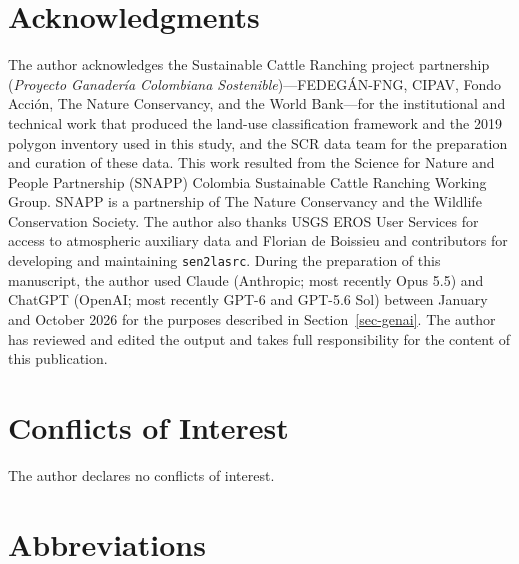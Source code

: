 \documentclass[remotesensing,article,submit,pdftex,oneauthor]{Definitions/mdpi}
\begin{document}
\section*{Acknowledgments}\label{acknowledgments}

The author acknowledges the Sustainable Cattle Ranching project
partnership (\emph{Proyecto Ganadería Colombiana
Sostenible})---FEDEGÁN-FNG, CIPAV, Fondo Acción, The Nature Conservancy,
and the World Bank---for the institutional and technical work that
produced the land-use classification framework and the 2019 polygon
inventory used in this study, and the SCR data team for the preparation
and curation of these data. This work resulted from the Science for
Nature and People Partnership (SNAPP) Colombia Sustainable Cattle
Ranching Working Group. SNAPP is a partnership of The Nature Conservancy
and the Wildlife Conservation Society. The author also thanks USGS EROS
User Services for access to atmospheric auxiliary data and Florian de
Boissieu and contributors for developing and maintaining
\texttt{sen2lasrc}. During the preparation of this manuscript, the
author used Claude (Anthropic; most recently Opus 5.5) and ChatGPT
(OpenAI; most recently GPT-6 and GPT-5.6 Sol) between January and
October 2026 for the purposes described in Section~\ref{sec-genai}. The
author has reviewed and edited the output and takes full responsibility
for the content of this publication.

\section*{Conflicts of Interest}\label{conflicts-of-interest}

The author declares no conflicts of interest.

\section*{Abbreviations}\label{abbreviations}
\end{document}
